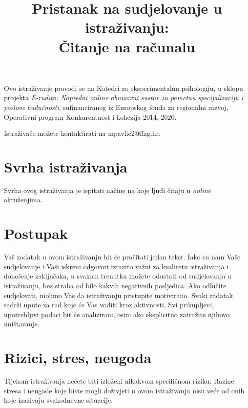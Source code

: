 \documentclass[11pt]{article}
\title{\bfseries \large Pristanak na sudjelovanje u istraživanju:\\
        \Large Čitanje na računalu}
\date{}
\author{}
\begin{document}
\vspace{-4em}

\maketitle

\vspace*{-4em}

\noindent Ovo istraživanje provodi se na Katedri za eksperimentalnu psihologiju, u sklopu
projekta \textit{E-rudito: Napredni online obrazovni sustav za pametnu
    specijalizaciju i poslove budućnosti}, sufinanciranog iz Europskog fonda za
regionalni razvoj, Operativni program Konkurentnost i kohezija 2014.-2020.

\vspace{6pt}

\noindent Istraživače možete kontaktirati na mpavlic2@ffzg.hr.

\section{Svrha istraživanja}

Svrha ovog istraživanja je ispitati načine na koje ljudi čitaju u \textit{online}
okruženjima.

\section{Postupak}

Vaš zadatak u ovom istraživanju bit će pročitati jedan tekst.
Iako su nam Vaše sudjelovanje i Vaši iskreni odgovori izrazito važni za
kvalitetu istraživanja i donošenje zaključaka, u svakom trenutku možete odustati
od sudjelovanja u istraživanju, bez
straha od bilo kakvih negativnih posljedica. Ako odlučite sudjelovati,
molimo Vas da istraživanju pristupite motivirano.
Svaki zadatak sadrži upute za rad koje će Vas voditi kroz aktivnosti.
Svi prikupljeni, upotrebljivi podaci bit će analizirani, osim ako eksplicitno
zatražite njihovo uništavanje.

\section{Rizici, stres, neugoda}

Tijekom istraživanja nećete biti izloženi nikakvom specifičnom riziku.
Razine stresa i neugode koje biste mogli doživjeti u ovom istraživanju nisu veće
od onih koje izazivaju svakodnevne situacije.
\end{document}

